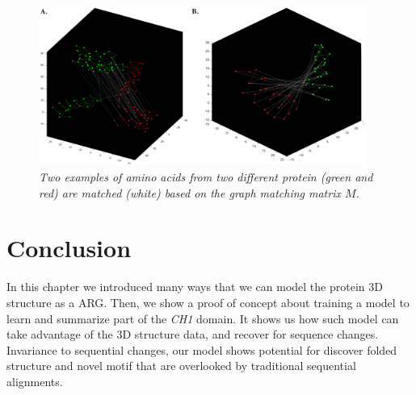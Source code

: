\begin{figure}[h]
	\centering
	\captionsetup{justification=centering}
	\includegraphics[width=0.95\textwidth]{figs/protein_match.png}
	\caption[Caption for LOF]{\emph{ Two examples of amino acids from two different protein (green and red) are matched (white) based on the graph matching matrix $M$.}}
	\label{fig:protein_match}
\end{figure}


\section{Conclusion}

In this chapter we introduced many ways that we can model the protein 3D structure as a ARG. Then, we show a proof of concept about training a model to learn and summarize part of the \emph{CH1} domain. It shows us how such model can take advantage of the 3D structure data, and recover for sequence changes. Invariance to sequential changes, our model shows potential for discover folded structure and novel motif that are overlooked by traditional sequential alignments.


